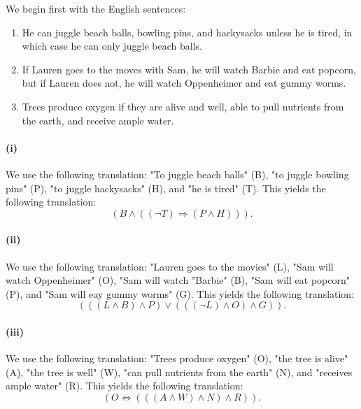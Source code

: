 \documentclass{report}
\begin{document}
  \begin{answer}

    We begin first with the English sentences:
      \begin{enumerate}[i]
        \item He can juggle beach balls, bowling pins, and hackysacks unless
          he is tired, in which case he can only juggle beach balls.
        \item
          If Lauren goes to the moves with Sam, he will watch Barbie and
            eat popcorn, but if Lauren does not, he will watch Oppenheimer and
            eat gummy worms.
        \item
          Trees produce oxygen if they are alive and well, able to pull
            nutrients from the earth, and receive ample water.
      \end{enumerate}

    \paragraph{(i)}%

      We use the following translation: "To juggle beach balls" (B),
        "to juggle bowling pins" (P), "to juggle hackysacks" (H), and
        "he is tired" (T).
      This yields the following translation:
        $$(B \land ((\neg T) \Rightarrow (P \land H))).$$

    \paragraph{(ii)}%

      We use the following translation: "Lauren goes to the movies" (L),
        "Sam will watch Oppenheimer" (O), "Sam will watch "Barbie" (B),
        "Sam will eat popcorn" (P), and "Sam will eay gummy worms" (G).
      This yields the following translation:
        $$(((L \land B) \land P) \lor (((\neg L) \land O) \land G)).$$

    \paragraph{(iii)}%

      We use the following translation: "Trees produce oxygen" (O),
        "the tree is alive" (A), "the tree is well" (W), "can pull nutrients
        from the earth" (N), and "receives ample water" (R).
      This yields the following translation:
        $$(O \iff (((A \land W) \land N) \land R)).$$

  \end{answer}
\end{document}
